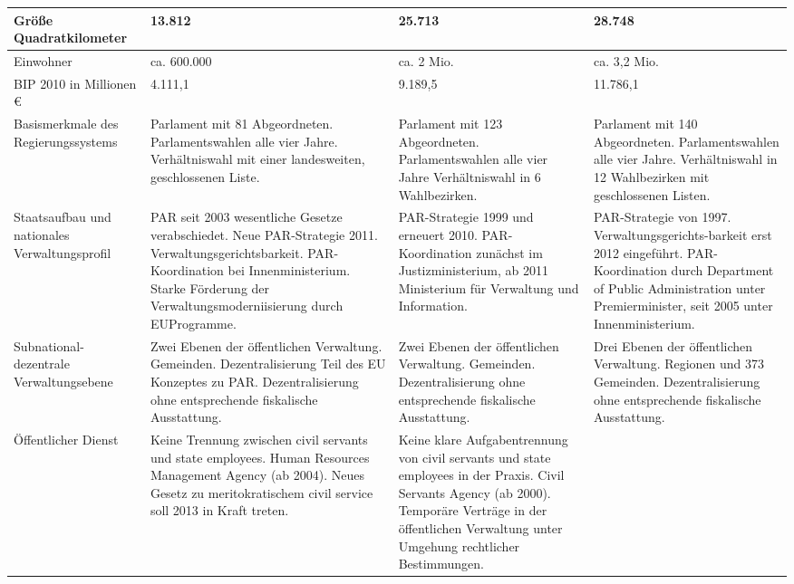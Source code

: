 \begin{footnotesize}
\begin{longtable}[H]{|M{30mm}|C{35mm}|C{35mm}|C{35mm}|}
Größe Quadratkilometer&13.812&25.713&28.748\\\hline
 Einwohner&ca. 600.000&ca. 2 Mio.&ca. 3,2 Mio.\\\hline
BIP 2010 in Millionen \euro{} &4.111,1&9.189,5&11.786,1\\\hline
Basismerkmale des Regierungssystems&
Parlament mit 81 Abgeordneten. 
Parlamentswahlen alle vier Jahre.
Verhältniswahl mit einer landesweiten, geschlossenen Liste.&
Parlament mit 123 Abgeordneten.
Parlamentswahlen alle vier Jahre
Verhältniswahl in 6 Wahlbezirken.&
Parlament mit 140 Abgeordneten.
Parlamentswahlen alle vier Jahre.
Verhältniswahl in 12 Wahlbezirken mit geschlossenen Listen.\\\hline
Staatsaufbau und nationales Verwaltungsprofil&
PAR seit 2003 wesentliche Gesetze verabschiedet.\newline
Neue PAR-Strategie 2011.
Verwaltungsgerichtsbarkeit.
PAR-Koordination bei Innenministerium.
Starke Förderung der Verwaltungsmoderniisierung durch EUProgramme.&
PAR-Strategie 1999 und erneuert 2010.
PAR-Koordination zunächst im Justizministerium, ab 2011 Ministerium für Verwaltung und Information.&
PAR-Strategie von 1997.\newline
Verwaltungsgerichts-barkeit erst 2012 eingeführt.
PAR-Koordination durch Department of Public Administration 
unter Premierminister,
seit 2005 unter Innenministerium.\\\hline
Subnational-dezentrale Verwaltungsebene&
Zwei Ebenen der öffentlichen Verwaltung. Gemeinden.
Dezentralisierung Teil des EU Konzeptes zu PAR.
Dezentralisierung ohne entsprechende fiskalische Ausstattung.&
Zwei Ebenen der öffentlichen Verwaltung.  Gemeinden.
Dezentralisierung ohne entsprechende fiskalische Ausstattung. &
Drei Ebenen der öffentlichen Verwaltung. Regionen und 373 Gemeinden.
Dezentralisierung ohne entsprechende fiskalische Ausstattung. \\\hline
Öffentlicher Dienst&
Keine Trennung zwischen civil servants und state employees.\newline
Human Resources Management Agency 
(ab 2004).\newline
Neues Gesetz zu meritokratischem civil service soll 2013 in Kraft treten.&
 Keine klare Aufgabentrennung von civil servants und state employees in der Praxis.\newline
Civil Servants Agency (ab 2000).
Temporäre Verträge in der öffentlichen Verwaltung unter Umgehung rechtlicher Bestimmungen.&

\end{longtable}
\end{footnotesize}
